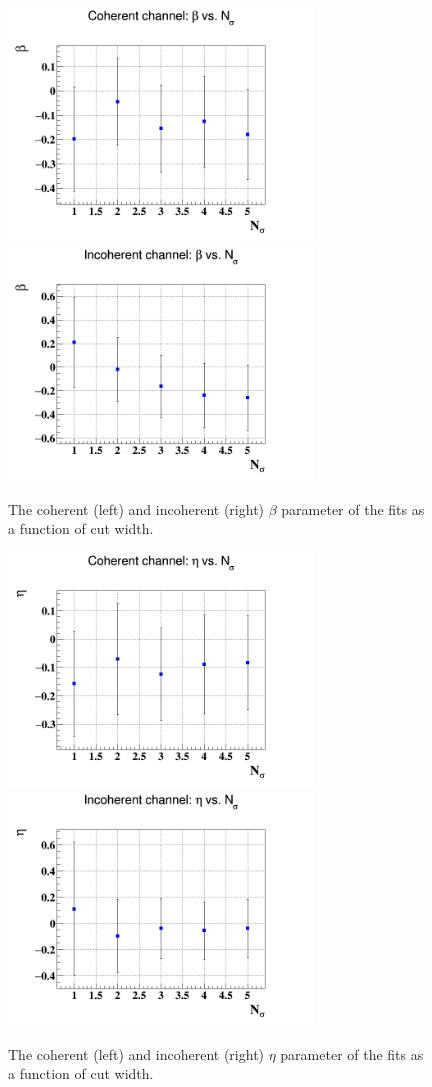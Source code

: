 \begin{figure}[tbp]
      \includegraphics[height=6.2cm]{fig_dvcs/coh_beta_Nsig.png}
         \includegraphics[height=6.2cm]{fig_dvcs/incoh_beta_Nsig.png}
            \caption{The coherent (left) and incoherent (right) $\beta$ 
               parameter of the
            fits as a function of cut width.  }
            \label{fig:sys_fit_beta}
         \end{figure}

\begin{figure}[tbp]
\includegraphics[height=6.2cm]{fig_dvcs/coh_eta_Nsig.png}
\includegraphics[height=6.2cm]{fig_dvcs/incoh_eta_Nsig.png}
   \caption{The coherent (left) and incoherent (right) $\eta$ parameter of the
   fits as a function of cut width.  }
   \label{fig:sys_fit_eta}
\end{figure}

